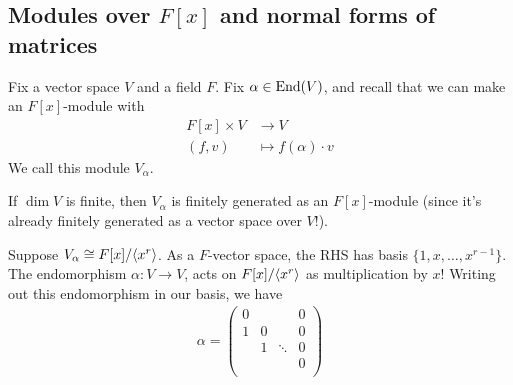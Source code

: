 \documentclass{../../template/note}
\begin{document}
    \subsection{Modules over $F[x]$ and normal forms of matrices}

    Fix a vector space $V$ and a field $F$. Fix $\alpha \in \operatorname{End}(V)$, and recall that we can make an $F[x]$-module with
    \begin{align*}
        F[x] \times V &\to V \\
        (f, v) &\mapsto f(\alpha) \cdot v
    \end{align*}
    We call this module $V_\alpha$.
    
    \begin{remark*}
        If $\dim V$ is finite, then $V_\alpha$ is finitely generated as an $F[x]$-module (since it's already finitely generated as a vector space over $V$!).
    \end{remark*}
    
    \begin{example*}
        Suppose $V_\alpha \cong F[x]/\!\left \langle x^r \right \rangle$. As a $F$-vector space, the RHS has basis $\{1, x, \dots, x^{r-1}\}$. The endomorphism $\alpha: V \to V$, acts on $F[x]/\!\left \langle x^r \right \rangle$ as multiplication by $x$! Writing out this endomorphism in our basis, we have
        \begin{align*}
            \alpha = \begin{pmatrix}
                0 &  &  & 0 \\
                1 & 0 &  & 0 \\
                 & 1 & \ddots & 0 \\
                 &  &  & 0 \\
            \end{pmatrix}
        \end{align*}
    \end{example*}
    
\end{document}
